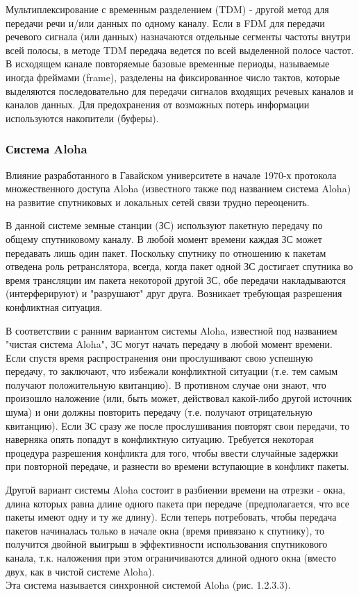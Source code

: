 \documentclass[a4paper]{report}
\begin{document}
Мультиплексирование с временным разделением (TDM) - другой метод для передачи речи и/или данных по одному каналу. Если в FDM для передачи речевого сигнала (или данных) назначаются отдельные сегменты частоты внутри всей полосы, в методе TDM передача ведется по всей выделенной полосе частот. В исходящем канале повторяемые базовые временные периоды, называемые иногда фреймами (frame), разделены на фиксированное число тактов, которые выделяются последовательно для передачи сигналов входящих речевых каналов и каналов данных. Для предохранения от возможных потерь информации используются накопители (буферы).

\subsubsection{Система Aloha}
Влияние разработанного в Гавайском университете в начале 1970-х протокола множественного доступа Aloha (известного также под названием система Aloha) на развитие спутниковых и локальных сетей связи трудно переоценить.

В данной системе земные станции (ЗС) используют пакетную передачу по общему спутниковому каналу. В любой момент времени каждая ЗС может передавать лишь один пакет. Поскольку спутнику по отношению к пакетам отведена роль ретранслятора, всегда, когда пакет одной ЗС достигает спутника во время трансляции им пакета некоторой другой ЗС, обе передачи накладываются (интерферируют) и "разрушают" друг друга. Возникает требующая разрешения конфликтная ситуация.

В соответствии с ранним вариантом системы Aloha, известной под названием "чистая система Aloha", ЗС могут начать передачу в любой момент времени. Если спустя время распространения они прослушивают свою успешную передачу, то заключают, что избежали конфликтной ситуации (т.е. тем самым получают положительную квитанцию). В противном случае они знают, что произошло наложение (или, быть может, действовал какой-либо другой источник шума) и они должны повторить передачу (т.е. получают отрицательную квитанцию). Если ЗС сразу же после прослушивания повторят свои передачи, то наверняка опять попадут в конфликтную ситуацию. Требуется некоторая процедура разрешения конфликта для того, чтобы ввести случайные задержки при повторной передаче, и разнести во времени вступающие в конфликт пакеты.

Другой вариант системы Aloha состоит в разбиении времени на отрезки - окна, длина которых равна длине одного пакета при передаче (предполагается, что все пакеты имеют одну и ту же длину). Если теперь потребовать, чтобы передача пакетов начиналась только в начале окна (время привязано к спутнику), то получится двойной выигрыш в эффективности использования спутникового канала, т.к. наложения при этом ограничиваются длиной одного окна (вместо двух, как в чистой системе Aloha). \\Эта система называется синхронной системой Aloha (рис. 1.2.3.3).
\end{document}

